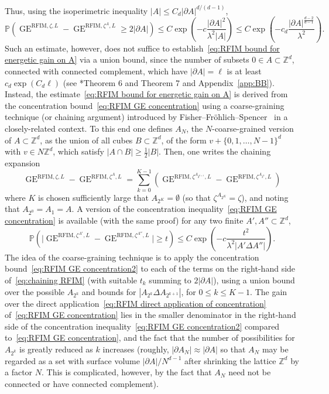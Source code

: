 \documentclass[11pt, reqno]{amsart}
\newcommand{\Z}{\mathbb{Z}}
\DeclareMathOperator{\GE}{GE}
\renewcommand{\P}{\mathbb{P}}
\numberwithin{equation}{section}
\begin{document}
Thus, using the isoperimetric inequality $|A|\le C_d |\partial A|^{d/(d-1)}$,
\begin{equation}\label{eq:RFIM direct application of concentration}
\P(\GE^{\text{RFIM}, \zeta,L}-\GE^{\text{RFIM}, \zeta^{A},L} \ge 2|\partial A|)\le C\exp\left(-c\frac{|\partial A|^2}{\lambda^2|A|}\right)\le  C\exp\left(-c_d\frac{|\partial A|^{\frac{d-2}{d-1}}}{\lambda^2}\right).
\end{equation}
Such an estimate, however, does not suffice to establish~\eqref{eq:RFIM bound for energetic gain on A} via a union bound, since the number of subsets $0\in A\subset\Z^d$, connected with connected complement, which have $|\partial A|=\ell$ is at least $c_d\exp(C_d \ell)$ (see \cite{BB}*{Theorem 6 and Theorem 7} and Appendix~\ref{app:BB}). Instead, the estimate~\eqref{eq:RFIM bound for energetic gain on A} is derived from the concentration bound~\eqref{eq:RFIM GE concentration} using a coarse-graining technique (or chaining argument) introduced by Fisher--Fr\"ohlich--Spencer~\cite{FFS} in a closely-related context. To this end one defines $A_N$, the $N$-coarse-grained version of $A\subset\Z^d$, as the union of all cubes $B\subset\Z^d$, of the form $v+\{0,1,\ldots,N-1\}^d$ with $v\in N\Z^d$, which satisfy $|A\cap B|\ge \frac{1}{2}|B|$. Then, one writes the chaining expansion
\begin{equation}\label{eq:chaining RFIM}
\GE^{\text{RFIM}, \zeta,L}-\GE^{\text{RFIM}, \zeta^A,L} = \sum_{k=0}^{K-1} \left(\GE^{\text{RFIM}, \zeta^{A_{2^{k+1}}},L}-\GE^{\text{RFIM}, \zeta^{A_{2^k}},L}\right)
\end{equation}
where $K$ is chosen sufficiently large that $A_{2^K}=\emptyset$ (so that $\zeta^{A_{2^K}}=\zeta$), and noting that $A_{2^0}=A_1=A$. A version of the concentration inequality~\eqref{eq:RFIM GE concentration} is available (with the same proof) for any two finite $A', A''\subset\Z^d$,
\begin{equation}\label{eq:RFIM GE concentration2}
\P\left(\big|\GE^{\text{RFIM}, \zeta^{A'},L}-\GE^{\text{RFIM}, \zeta^{A''},L}\big|\ge t\right)\le C\exp\left(-c\frac{t^2}{\lambda^2|A'\Delta A''|}\right).
\end{equation}
The idea of the coarse-graining technique is to apply the concentration bound~\eqref{eq:RFIM GE concentration2} to each of the terms on the right-hand side of~\eqref{eq:chaining RFIM} (with suitable $t_k$ summing to $2|\partial A|$), using a union bound over the possible $A_{2^k}$ and bounds for $|A_{2^k}\Delta A_{2^{k+1}}|$, for $0\le k\le K-1$. The gain over the direct application~\eqref{eq:RFIM direct application of concentration} of~\eqref{eq:RFIM GE concentration} lies in the smaller denominator in the right-hand side of the concentration inequality~\eqref{eq:RFIM GE concentration2} compared to~\eqref{eq:RFIM GE concentration}, and the fact that the number of possibilities for $A_{2^k}$ is greatly reduced as $k$ increases (roughly, $|\partial A_N|\approx |\partial A|$ so that $A_N$ may be regarded as a set with surface volume $|\partial A|/N^{d-1}$ after shrinking the lattice $\Z^d$ by a factor $N$. This is complicated, however, by the fact that $A_N$ need not be connected or have connected complement).
\end{document}
